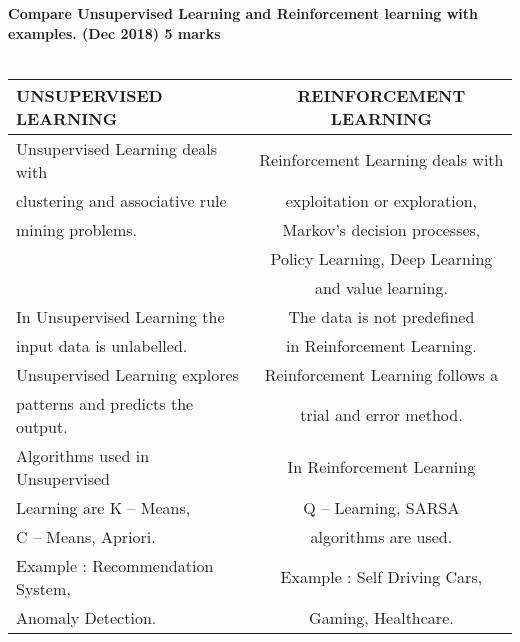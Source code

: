 \textbf{\textcolor{LightMagenta}{Compare Unsupervised Learning and Reinforcement learning with examples. (Dec 2018) \hfill 5 marks}} \\[5pt]
\\
\renewcommand{\arraystretch}{1}
\begin{tabular}{|l|c|}
	\hline \hline
    {\bfseries UNSUPERVISED LEARNING}	& {\bfseries REINFORCEMENT LEARNING} \\
    \hline
    \hline
     Unsupervised Learning deals with & Reinforcement Learning deals with \\
     clustering and associative rule  & exploitation or exploration, \\
     mining problems. &  Markov’s decision processes, \\
     & Policy Learning, Deep Learning \\
     &  and value learning. \\
    \hline
   In Unsupervised Learning the &  The data is not predefined \\
   input data is unlabelled. & in Reinforcement Learning. \\
    \hline
    Unsupervised Learning explores & Reinforcement Learning follows a  \\
    patterns and predicts the output. & trial and error method.\\
    \hline
    Algorithms used in Unsupervised & In Reinforcement Learning  \\
    Learning are K – Means, & Q – Learning, SARSA \\
    C – Means, Apriori. & algorithms are used. \\
    \hline
    Example : Recommendation System, & Example : Self Driving Cars, \\
    Anomaly Detection. & Gaming, Healthcare.\\
    \hline
    \hline
   \end{tabular}